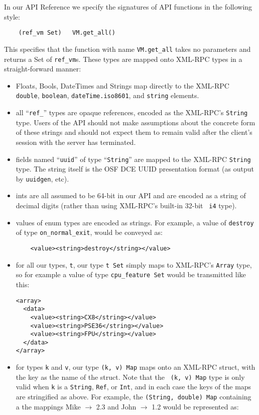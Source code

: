 In our API Reference we specify the signatures of API functions in the following
style:
\begin{verbatim}
    (ref_vm Set)   VM.get_all()
\end{verbatim}
This specifies that the function with name {\tt VM.get\_all} takes
no parameters and returns a Set of {\tt ref\_vm}s.
These types are mapped onto XML-RPC types in a straight-forward manner:
\begin{itemize}
  \item Floats, Bools, DateTimes and Strings map directly to the XML-RPC {\tt
  double}, {\tt boolean}, {\tt dateTime.iso8601}, and {\tt string} elements.

  \item all ``{\tt ref\_}'' types are opaque references, encoded as the
  XML-RPC's {\tt String} type. Users of the API should not make assumptions
  about the concrete form of these strings and should not expect them to
  remain valid after the client's session with the server has terminated.

  \item fields named ``{\tt uuid}'' of type ``{\tt String}'' are mapped to
  the XML-RPC {\tt String} type. The string itself is the OSF
  DCE UUID presentation format (as output by {\tt uuidgen}, etc).

  \item ints are all assumed to be 64-bit in our API and are encoded as a
  string of decimal digits (rather than using XML-RPC's built-in 32-bit {\tt
  i4} type).

  \item values of enum types are encoded as strings. For example, a value of
  {\tt destroy} of type {\tt on\_normal\_exit}, would be conveyed as:
  \begin{verbatim}
    <value><string>destroy</string></value>
  \end{verbatim}

  \item for all our types, {\tt t}, our type {\tt t Set} simply maps to
  XML-RPC's {\tt Array} type, so for example a value of type {\tt cpu\_feature
  Set} would be transmitted like this:

  \begin{verbatim}
<array>
  <data>
    <value><string>CX8</string></value>
    <value><string>PSE36</string></value>
    <value><string>FPU</string></value>
  </data>
</array> 
  \end{verbatim}

  \item for types {\tt k} and {\tt v}, our type {\tt (k, v) Map} maps onto an
  XML-RPC struct, with the key as the name of the struct.  Note that the {\tt
  (k, v) Map} type is only valid when {\tt k} is a {\tt String}, {\tt Ref}, or
  {\tt Int}, and in each case the keys of the maps are stringified as
  above. For example, the {\tt (String, double) Map} containing a the mappings
  Mike $\rightarrow$ 2.3 and John $\rightarrow$ 1.2 would be represented as:


\end{itemize}
